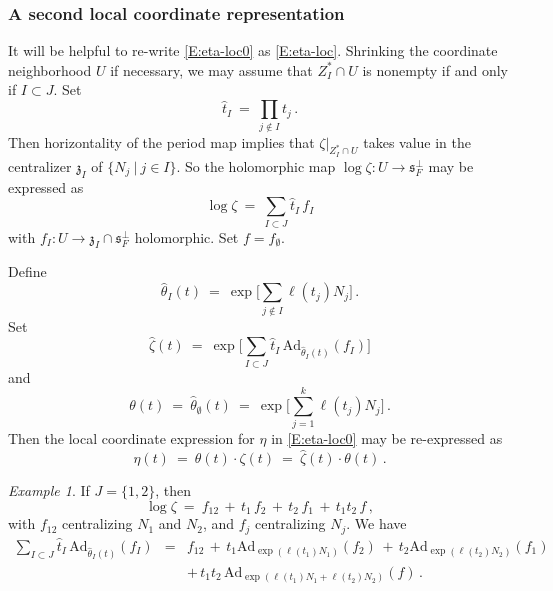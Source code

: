 \documentclass[12pt]{amsart}
\numberwithin{equation}{section}
\numberwithin{table}{section}
\def\z{\zeta}
\def\tAd{\mathrm{Ad}}
\theoremstyle{definition}
\theoremstyle{definition}
\theoremstyle{remark}
\newtheorem{example}[equation]{Example}
\def\fs{\mathfrak{s}}
\def\fz{\mathfrak{z}}
\begin{document}
\subsubsection{A second local coordinate representation}\label{S:loc2}

It will be helpful to re-write \eqref{E:eta-loc0} as \eqref{E:eta-loc}.  Shrinking the coordinate neighborhood $U$ if necessary, we may assume that $Z_I^* \cap U$ is nonempty if and only if $I \subset J$.  Set 
\[
  \hat t_I \ = \ \prod_{j \not\in I} t_j \,.
\]
Then horizontality of the period map implies that $\zeta\big|_{Z_I^*\cap U}$ takes value in the centralizer $\fz_I$ of $\{ N_j \ | \ j \in I \}$.  So the holomorphic map $\log\z : U \to \fs_F^\perp$ may be expressed as 
\[
  \log \z \ = \ \sum_{I \subset J} \hat t_I \,f_I 
\]
with $f_I  : U  \to \fz_I \cap \fs_F^\perp$ holomorphic.  Set $f = f_\emptyset$.

Define 
\[
  \hat\theta_I(t) 
  \ = \ \exp \Big[ \sum_{j\not\in I} \ell(t_j) N_j  \Big] \,.
\]
Set
\begin{equation}\label{E:a}
   \hat\zeta(t) \ = \ 
   \exp \Big[ \sum_{I \subset J}
  	\hat t_I\,\tAd_{\hat\theta_I(t)}(f_I)
  \Big]
\end{equation}
and
\[
  \theta(t) \ = \ \hat\theta_\emptyset(t)
  \ = \ \exp \Big[ \sum_{j=1}^k \ell(t_j) N_j  \Big] \,.
\]
Then the local coordinate expression for $\eta$ in \eqref{E:eta-loc0} may be re-expressed as 
\begin{equation}\label{E:eta-loc}
  \eta(t) 
  \ = \ \theta(t) \cdot \zeta(t)
  \ = \ 
  \hat\z(t) \cdot \theta(t) \,.
\end{equation}

\begin{example} \label{eg:1}
If $J =  \{1,2\}$, then 
\[
  \log \z \ = \ f_{12} \,+\,
  t_1\,f_2 \,+\, t_2\,f_1 \,+\, t_1 t_2  \, f \,,
\]
with $f_{12}$ centralizing $N_1$ and $N_2$, and $f_j$ centralizing $N_j$.  We have 
\begin{eqnarray*}
  \sum_{I \subset J} \hat t_I\,\tAd_{\hat\theta_I(t)}(f_I)
  & = & f_{12} \,+\, t_1 \tAd_{\exp(\ell(t_1)N_1)}(f_2)
  \,+\, t_2 \tAd_{\exp(\ell(t_2)N_2)}(f_1) 
  \\ & & + \,
  t_1 t_2 \, \tAd_{\exp(\ell(t_1)N_1+\ell(t_2)N_2)}(f) \,.
\end{eqnarray*}
\end{example}

\end{document}
